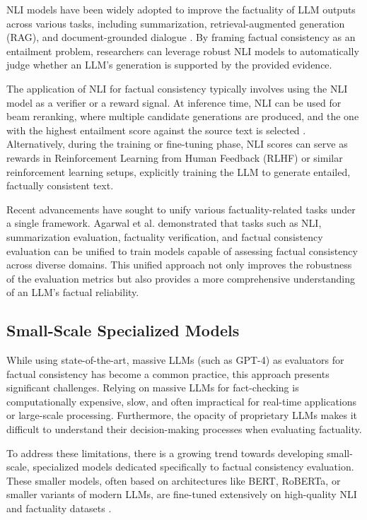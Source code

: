 \documentclass[11pt,a4paper]{article}
\begin{document}
NLI models have been widely adopted to improve the factuality of LLM outputs across various tasks, including summarization, retrieval-augmented generation (RAG), and document-grounded dialogue \cite{Harary_2025_Prefixnli}. By framing factual consistency as an entailment problem, researchers can leverage robust NLI models to automatically judge whether an LLM's generation is supported by the provided evidence.

The application of NLI for factual consistency typically involves using the NLI model as a verifier or a reward signal. At inference time, NLI can be used for beam reranking, where multiple candidate generations are produced, and the one with the highest entailment score against the source text is selected \cite{Harary_2025_Prefixnli}. Alternatively, during the training or fine-tuning phase, NLI scores can serve as rewards in Reinforcement Learning from Human Feedback (RLHF) or similar reinforcement learning setups, explicitly training the LLM to generate entailed, factually consistent text.

Recent advancements have sought to unify various factuality-related tasks under a single framework. Agarwal et al. \cite{Agarwal_2024_Zero} demonstrated that tasks such as NLI, summarization evaluation, factuality verification, and factual consistency evaluation can be unified to train models capable of assessing factual consistency across diverse domains. This unified approach not only improves the robustness of the evaluation metrics but also provides a more comprehensive understanding of an LLM's factual reliability.

\subsection{Small-Scale Specialized Models}

While using state-of-the-art, massive LLMs (such as GPT-4) as evaluators for factual consistency has become a common practice, this approach presents significant challenges. Relying on massive LLMs for fact-checking is computationally expensive, slow, and often impractical for real-time applications or large-scale processing. Furthermore, the opacity of proprietary LLMs makes it difficult to understand their decision-making processes when evaluating factuality.

To address these limitations, there is a growing trend towards developing small-scale, specialized models dedicated specifically to factual consistency evaluation. These smaller models, often based on architectures like BERT, RoBERTa, or smaller variants of modern LLMs, are fine-tuned extensively on high-quality NLI and factuality datasets \cite{Agarwal_2024_Zero}.
\end{document}
